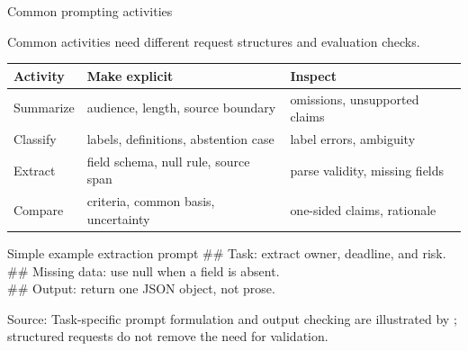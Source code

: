 \documentclass[aspectratio=169]{beamer}
\newcommand{\slidesource}[1]{\vfill{\raggedright\tiny\color{hrgray}Source: #1\par}}
\begin{document}
\begin{frame}{Common prompting activities}
\footnotesize
\begin{center}
Common activities need different request structures and evaluation checks.
\end{center}
\begin{center}\begin{tabular}{p{.22\linewidth}p{.30\linewidth}p{.34\linewidth}}
\toprule
Activity & Make explicit & Inspect\\ \midrule
Summarize & audience, length, source boundary & omissions, unsupported claims\\
Classify & labels, definitions, abstention case & label errors, ambiguity\\
Extract & field schema, null rule, source span & parse validity, missing fields\\
Compare & criteria, common basis, uncertainty & one-sided claims, rationale\\ \bottomrule
\end{tabular}\end{center}
\begin{block}{Simple example extraction prompt}
\ttfamily\tiny\#\# Task: extract owner, deadline, and risk.\\\#\# Missing data: use null when a field is absent.\\\#\# Output: return one JSON object, not prose.
\end{block}
\slidesource{Task-specific prompt formulation and output checking are illustrated by \textcite{Illinois2026PromptEngineering}; structured requests do not remove the need for validation.}
\end{frame}
\end{document}
